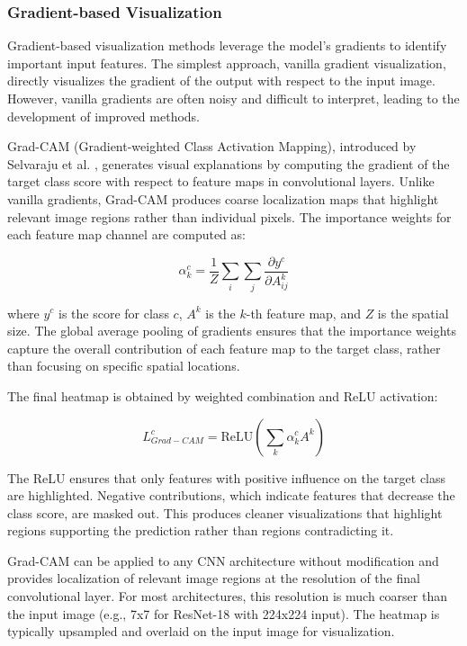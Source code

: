 \documentclass[12pt,a4paper]{article}
\begin{document}
\subsubsection{Gradient-based Visualization}

Gradient-based visualization methods leverage the model's gradients to identify important input features. The simplest approach, vanilla gradient visualization, directly visualizes the gradient of the output with respect to the input image. However, vanilla gradients are often noisy and difficult to interpret, leading to the development of improved methods.

Grad-CAM (Gradient-weighted Class Activation Mapping), introduced by Selvaraju et al. \cite{selvaraju2017}, generates visual explanations by computing the gradient of the target class score with respect to feature maps in convolutional layers. Unlike vanilla gradients, Grad-CAM produces coarse localization maps that highlight relevant image regions rather than individual pixels. The importance weights for each feature map channel are computed as:

\begin{equation}
    \alpha_k^c = \frac{1}{Z} \sum_i \sum_j \frac{\partial y^c}{\partial A_{ij}^k}
\end{equation}

where $y^c$ is the score for class $c$, $A^k$ is the $k$-th feature map, and $Z$ is the spatial size. The global average pooling of gradients ensures that the importance weights capture the overall contribution of each feature map to the target class, rather than focusing on specific spatial locations.

The final heatmap is obtained by weighted combination and ReLU activation:

\begin{equation}
    L_{Grad-CAM}^c = \text{ReLU}\left(\sum_k \alpha_k^c A^k\right)
\end{equation}

The ReLU ensures that only features with positive influence on the target class are highlighted. Negative contributions, which indicate features that decrease the class score, are masked out. This produces cleaner visualizations that highlight regions supporting the prediction rather than regions contradicting it.

Grad-CAM can be applied to any CNN architecture without modification and provides localization of relevant image regions at the resolution of the final convolutional layer. For most architectures, this resolution is much coarser than the input image (e.g., 7x7 for ResNet-18 with 224x224 input). The heatmap is typically upsampled and overlaid on the input image for visualization.
\end{document}
